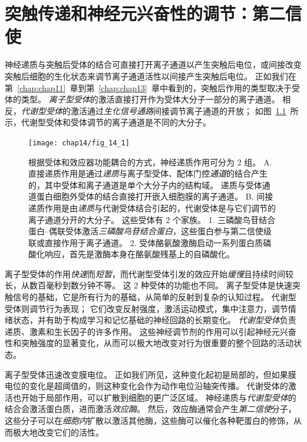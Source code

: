 \chapter{突触传递和神经元兴奋性的调节：第二信使} \label{chap:chap14}

神经递质与突触后受体的结合可直接打开离子通道以产生突触后电位，或间接改变突触后细胞的生化状态来调节离子通道活性以间接产生突触后电位。
正如我们在第~\ref{chap:chap11}~章到第~\ref{chap:chap13}~章中看到的，突触后作用的类型取决于受体的类型。
\textit{离子型受体}的激活直接打开作为受体大分子一部分的离子通道。
相反，\textit{代谢型受体}的激活通过\textit{生化信号通路}间接调节离子通道的开放；
如图~\ref{fig:14_1}~所示，代谢型受体和受体调节的离子通道是不同的大分子。


\begin{figure}[htbp]
	\centering
	\texttt{[image: chap14/fig\_14\_1]}
	\caption{根据受体和效应器功能耦合的方式，神经递质作用可分为 2 组。
		A. 直接递质作用是通过\textit{递质}与离子型受体、配体门控\textit{通道}的结合产生的，其中受体和离子通道是单个大分子内的结构域。
		递质与受体通道蛋白细胞外受体的结合直接打开嵌入细胞膜的离子通道。
		B. 间接递质作用是由\textit{递质}与代谢受体结合引起的，代谢受体是与它们调节的离子通道分开的大分子。
		这些受体有 2 个家族。
		1. 三磷酸鸟苷结合蛋白–偶联受体激活\textit{三磷酸鸟苷结合蛋白}，这些蛋白参与第二信使级联或直接作用于离子通道。
		2. 受体酪氨酸激酶启动一系列蛋白质磷酸化响应，首先是激酶本身在酪氨酸残基上的自磷酸化。}
	\label{fig:14_1}
\end{figure}


离子型受体的作用\textit{快速}而\textit{短暂}，而代谢型受体引发的效应开始\textit{缓慢}且持续时间较长，从数百毫秒到数分钟不等。
这 2 种受体的功能也不同。
离子型受体是快速突触信号的基础，它是所有行为的基础，从简单的反射到复杂的认知过程。
代谢型受体则调节行为表现；
它们改变反射强度，激活运动模式，集中注意力，调节情绪状态，并有助于构成学习和记忆基础的神经回路的长期变化。
\textit{代谢型受体}负责递质、激素和生长因子的许多作用。
这些神经调节剂的作用可以引起神经元兴奋性和突触强度的显著变化，从而可以极大地改变对行为很重要的整个回路的活动状态。


离子型受体迅速改变膜电位。
正如我们所见，这种变化起初是局部的，但如果膜电位的变化是超阈值的，则这种变化会作为动作电位沿轴突传播。
代谢受体的激活也开始于局部作用，可以扩散到细胞的更广泛区域。
神经递质与\textit{代谢型受体}的结合会激活蛋白质，进而激活\textit{效应酶}。
然后，效应酶通常会产生\textit{第二信使}分子，这些分子可以在\textit{细胞内}扩散以激活其他酶，这些酶可以催化各种靶蛋白的修饰，从而极大地改变它们的活性。


